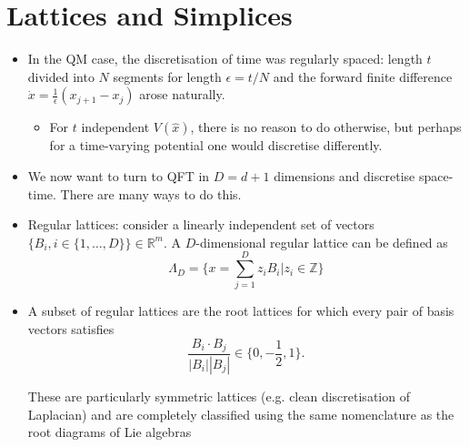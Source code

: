 \section{Lattices and Simplices}

\begin{itemize}

\item In the QM case, the discretisation of time was regularly spaced: length $t$ divided into $N$ segments for length $\epsilon=t/N$ and the forward finite difference $\dot x=\frac{1}{\epsilon}(x_{j+1}-x_j)$ arose naturally.
\begin{itemize}
    \item For $t$ independent $V(\hat{x})$, there is no reason to do otherwise, but perhaps for a time-varying potential one would discretise differently.
\end{itemize}

\item We now want to turn to QFT in $D=d+1$ dimensions and discretise space-time. There are many ways to do this.

\item Regular lattices: consider a linearly independent set of vectors $\{B_i, i\in\{1,\ldots,D\}\}\in \mathbb{R}^m$. A $D$-dimensional regular lattice can be defined as
\begin{equation}
\Lambda_D=\{x=\sum_{j=1}^Dz_i B_i |z_i\in \mathbb{Z}\}
\end{equation}

\item A subset of regular lattices are the root lattices for which every pair of basis vectors satisfies
\begin{equation}
\frac{B_i\cdot B_j}{|B_i||B_j|}\in\{0,-\frac{1}{2},1\}.
\end{equation}

These are particularly symmetric lattices (e.g. clean discretisation of Laplacian) and are completely classified using the same nomenclature as the root diagrams of Lie algebras


\end{itemize}
